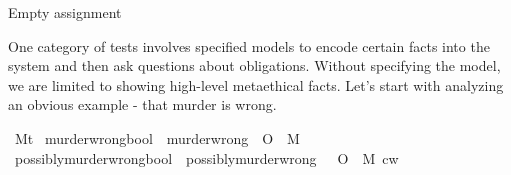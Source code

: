 \begin{isabellebody}
{  Empty assignment \color{black}%
}\isanewline
%
\isanewline
\isanewline
%
\endisatagproof
{\isafoldproof}%
%
\isadelimproof
%
\endisadelimproof
%
\isadelimproof
%
\endisadelimproof
%
\isatagproof
%
\endisatagproof
{\isafoldproof}%
%
\isadelimproof
%
\endisadelimproof
%
\isadelimproof
%
\endisadelimproof
%
\isatagproof
%
\endisatagproof
{\isafoldproof}%
%
\isadelimproof
%
\endisadelimproof
%
\isadelimproof
%
\endisadelimproof
%
\isatagproof
%
\endisatagproof
{\isafoldproof}%
%
\isadelimproof
%
\endisadelimproof
%
\isadelimproof
%
\endisadelimproof
%
\isatagproof
%
\endisatagproof
{\isafoldproof}%
%
\isadelimproof
%
\endisadelimproof
%
\isadelimdocument
%
\endisadelimdocument
%
\isatagdocument
%
\isamarkuptrue%
%
\endisatagdocument
{\isafolddocument}%
%
\isadelimdocument
%
\endisadelimdocument
%
\begin{isamarkuptext}%
One category of tests involves specified models to encode certain facts 
into the system and then ask questions about obligations. Without specifying the model, we are limited 
to showing high-level metaethical facts. Let's start with analyzing an obvious example - that murder is 
wrong.%
\end{isamarkuptext}\isamarkuptrue%
\isamarkupfalse%
\ M{\isacharcolon}{\isacharcolon}{\isachardoublequoteopen}t{\isachardoublequoteclose}\isanewline
{}\isamarkupfalse%
\ murder{\isacharunderscore}wrong{\isacharcolon}{\isacharcolon}{\isachardoublequoteopen}bool{\isachardoublequoteclose}\ \ {\isachardoublequoteopen}murder{\isacharunderscore}wrong\ {\isasymequiv}\ {\isasymTurnstile}{\isacharparenleft}O\ {\isacharbraceleft}\isactrlbold {\isasymnot}\ M{\isacharbraceright}{\isacharparenright}{\isachardoublequoteclose}\isanewline
%
\isadelimproof
%
\endisadelimproof
%
\isatagproof
%
\endisatagproof
{\isafoldproof}%
%
\isadelimproof
\isanewline
%
\endisadelimproof
{}\isamarkupfalse%
\ possibly{\isacharunderscore}murder{\isacharunderscore}wrong{\isacharcolon}{\isacharcolon}{\isachardoublequoteopen}bool{\isachardoublequoteclose}\ \ {\isachardoublequoteopen}possibly{\isacharunderscore}murder{\isacharunderscore}wrong\ {\isasymequiv}\ {\isacharparenleft}{\isasymdiamond}\ {\isacharparenleft}O\ {\isacharbraceleft}\isactrlbold {\isasymnot}\ M{\isacharbraceright}{\isacharparenright}{\isacharparenright}\ cw{\isachardoublequoteclose}\isanewline

\end{isabellebody}
